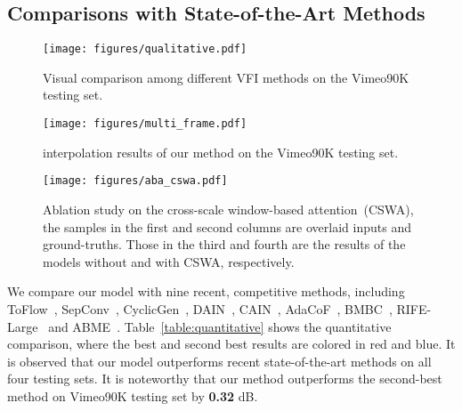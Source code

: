 \documentclass[10pt,twocolumn,letterpaper]{article}
\begin{document}
	
	
	
	
	
	
	


	\subsection{Comparisons with State-of-the-Art Methods}
	
	\begin{figure*}[t]
		\begin{center}
\texttt{[image: figures/qualitative.pdf]}
		\end{center}
		\vspace{-0.15in}
		\caption{Visual comparison among different VFI methods on the Vimeo90K testing set.}
		\label{fig:qualitative}
		\vspace{-0.1in}
	\end{figure*}
	
	
	\begin{figure*}[t]
		\begin{center}
\texttt{[image: figures/multi\_frame.pdf]}
		\end{center}
		\vspace{-0.1in}
		\caption{ interpolation results of our method on the Vimeo90K testing set.}
		\label{fig:multi_frame}
	\end{figure*}
	
	
	
	
	\begin{figure}[t]
		\begin{center}
\texttt{[image: figures/aba\_cswa.pdf]}
		\end{center}
		\vspace{-0.05in}
		\caption{Ablation study on the cross-scale window-based attention~(CSWA), the samples in the first and second columns are overlaid inputs and ground-truths. Those in the third and fourth are the results of the models without and with CSWA, respectively.}
		\label{fig:aba_cswa}
		\vspace{-0.1in}
	\end{figure}
	
	We compare our model with nine recent, competitive methods, including ToFlow~\cite{vimeo90k}, SepConv~\cite{niklaus2017video}, CyclicGen~\cite{liu2019deep}, DAIN~\cite{bao2019depth}, CAIN~\cite{snufilm}, AdaCoF~\cite{lee2020adacof}, BMBC~\cite{park2020bmbc}, RIFE-Large~\cite{rife} and ABME~\cite{asymmetric}. Table~\ref{table:quantitative} shows the quantitative comparison, where the best and second best results are colored in red and blue. It is observed that our model outperforms recent state-of-the-art methods on all four testing sets.
	It is noteworthy that our method outperforms the second-best method on Vimeo90K testing set by \textbf{0.32} dB.
	
\end{document}
